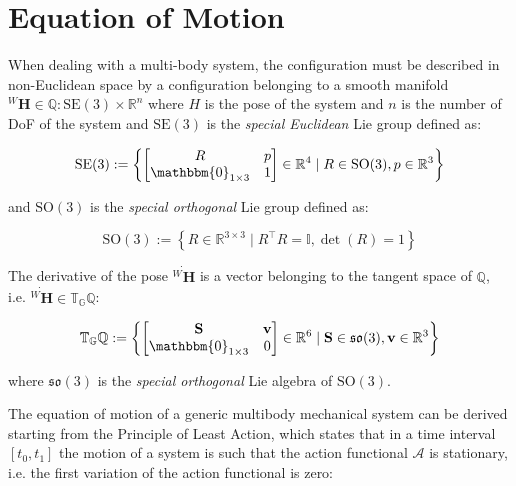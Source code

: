\section{Equation of Motion}
\label{sec:back_eom}

When dealing with a multi-body system, the configuration must be described in non-Euclidean space by a configuration belonging to a smooth manifold ${}^W\mathbf{H} \in \mathbb{Q}:\mathrm{SE}(3)\times\mathbb{R}^n$ where $H$ is the pose of the system and $n$ is the number of \ac{DoF} of the system and $\mathrm{SE}(3)$ is the \textit{special Euclidean} Lie group defined as:

\begin{equation}
    \mathrm{SE}(3) := \left\{
    \begin{bmatrix}
        R                         & p \\
        \mathbbm{0} _{1 \times 3} & 1
    \end{bmatrix} \in \mathbb{R} ^4 \mid R \in \mathrm{SO}(3), p \in \mathbb{R} ^3
    \right\}
\end{equation}

and $\mathrm{SO}(3)$ is the \textit{special orthogonal} Lie group defined as:

\begin{equation}
    \mathrm{SO}(3) := \left\{
    R \in \mathbb{R} ^{3 \times 3} \mid R ^\top R = \mathbb{I}, \det(R) = 1
    \right\}
\end{equation}

The derivative of the pose $\dot{{}^W\mathbf{H}}$ is a vector belonging to the tangent space of $\mathbb{Q}$, i.e. $\dot{{}^W\mathbf{H}} \in \mathbb{T} _{\mathbb{G}} \mathbb{Q}$:

\begin{equation}
    \mathbb{T} _{\mathbb{G}} \mathbb{Q} := \left\{
    \begin{bmatrix}
        \mathbf{S}                & \mathbf{v} \\
        \mathbbm{0} _{1 \times 3} & 0
    \end{bmatrix} \in \mathbb{R} ^6 \mid \mathbf{S} \in \mathfrak{so}(3), \mathbf{v} \in \mathbb{R} ^3
    \right\}
\end{equation}

where $\mathfrak{so}(3)$ is the \textit{special orthogonal} Lie algebra of $\mathrm{SO}(3)$.

The equation of motion of a generic multibody mechanical system can be derived starting from the Principle of Least Action, which states that in a time interval $[t _0, t _1]$ the motion of a system is such that the action functional $\mathcal{A}$ is stationary, i.e. the first variation of the action functional is zero:

